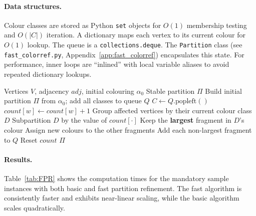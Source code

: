 \documentclass[twoside]{article}
\begin{document}
\paragraph{Data structures.}
Colour classes are stored as Python \texttt{set} objects for $O(1)$ membership testing and $O(|C|)$ iteration. A dictionary maps each vertex to its current colour for $O(1)$ lookup. The queue is a \texttt{collections.deque}. The \texttt{Partition} class (see \texttt{fast\_colorref.py}, Appendix~\ref{app:fast_colorref}) encapsulates this state. For performance, inner loops are ``inlined'' with local variable aliases to avoid repeated dictionary lookups.

\begin{algorithm}[H]
\caption{Fast Colour Refinement (Hopcroft-style)}\label{alg:fast_cr}
\begin{algorithmic}[1]
\Require Vertices $V$, adjacency $\textit{adj}$, initial colouring $\alpha_0$
\Ensure Stable partition $\Pi$
\State Build initial partition $\Pi$ from $\alpha_0$; add all classes to queue $Q$
    \State $C \gets Q.\text{popleft}()$
        \State $\textit{count}[w] \gets \textit{count}[w] + 1$
    \EndFor
    \State Group affected vertices by their current colour class $D$
        \State Subpartition $D$ by the value of $\textit{count}[\cdot]$
            \State Keep the \textbf{largest} fragment in $D$'s colour
            \State Assign new colours to the other fragments
                \State Add each non-largest fragment to $Q$
            \EndIf
        \EndIf
    \EndFor
    \State Reset $\textit{count}$
\EndWhile
\State \Return $\Pi$
\end{algorithmic}
\end{algorithm}

\paragraph{Results.}
Table~\ref{tab:FPR} shows the computation times for the mandatory sample instances with both basic and fast partition refinement. The fast algorithm is consistently faster and exhibits near-linear scaling, while the basic algorithm scales quadratically.
\end{document}
